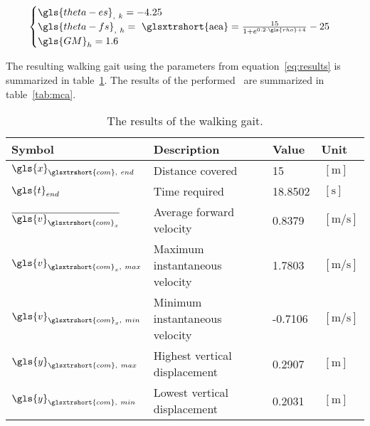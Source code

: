 \begin{align}
    \begin{cases}
        \gls{theta-es}_{,~k} = -4.25  \\
        \gls{theta-fs}_{,~h} =~\text{\glsxtrshort{aea}} = \frac{15}{1 + e^{0.2 \cdot \gls{rho} + 4}} - 25  \\
        \gls{GM}_h = 1.6
    \end{cases}      
    \label{eq:results}%
\end{align}

The resulting walking gait using the parameters from equation~\ref{eq:results} is summarized in table~\ref{tab:results}. The results of the performed~ are summarized in table~\ref{tab:mca}.

\begin{table}[H]
    \caption{The results of the walking gait.} \label{tab:results}
    \begin{center}
        \begin{tabular}{ l|l|l|l }
            \textbf{Symbol}                             & \textbf{Description}              & \textbf{Value}    & \textbf{Unit}                         \\ [0.5ex]
            \hline \hline
            $\gls{x}_{\glsxtrshort{com},~end}$                & Distance covered                  & 15                &$~\left[\si{\metre}\right]$            \\
            $\gls{t}_{end}$                             & Time required                     & 18.8502           &$~\left[\si{\second}\right]$           \\
            $\overline{\gls{v}_{\glsxtrshort{com}_x}}$ & Average forward velocity          & 0.8379            &$~\left[\si{\metre\per\second}\right]$ \\
            $\gls{v}_{\glsxtrshort{com}_x,~max}$       & Maximum instantaneous velocity    & 1.7803            &$~\left[\si{\metre\per\second}\right]$ \\
            $\gls{v}_{\glsxtrshort{com}_x,~min}$       & Minimum instantaneous velocity    & -0.7106           &$~\left[\si{\metre\per\second}\right]$ \\
            $\gls{y}_{\glsxtrshort{com},~max}$                & Highest vertical displacement     & 0.2907            &$~\left[\si{\metre}\right]$            \\
            $\gls{y}_{\glsxtrshort{com},~min}$                & Lowest vertical displacement      & 0.2031            &$~\left[\si{\metre}\right]$  
        \end{tabular}
    \end{center}
\end{table}

